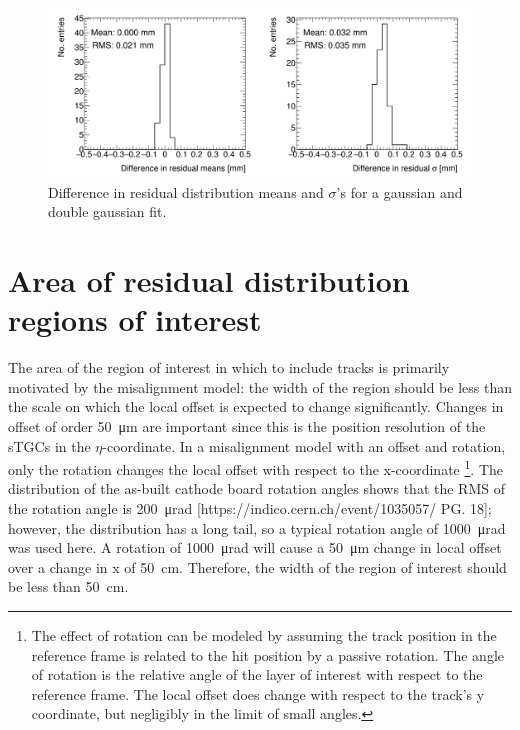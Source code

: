 \begin{figure}
    \centering
    \includegraphics[width = \textwidth]{figures/figure_compare_residual_fits_QL2C04_2900V_2021-02-08_2_fit_range_mean_pm_RMS_minus_quick_and_dirty_2900V_log_scale_layer1_fixedlayers34.png}
    \caption{Difference in residual distribution means and $\sigma$'s for a gaussian and double gaussian fit.}
    \label{fig:double_gaussian_compare_fits}
\end{figure}

\section{Area of residual distribution regions of interest}
\label{appendix:systematics_bin_size}


The area of the region of interest in which to include tracks is primarily motivated by the misalignment model: the width of the region should be less than the scale on which the local offset is expected to change significantly. Changes in offset of order \SI{50}{\micro\meter} are important since this is the position resolution of the sTGCs in the $\eta$-coordinate. In a misalignment model with an offset and rotation, only the rotation changes the local offset with respect to the x-coordinate \footnote{The effect of rotation can be modeled by assuming the track position in the reference frame is related to the hit position by a passive rotation. The angle of rotation is the relative angle of the layer of interest with respect to the reference frame. The local offset does change with respect to the track's y coordinate, but negligibly in the limit of small angles.}.  The distribution of the as-built cathode board rotation angles shows that the RMS of the rotation angle is \SI{200}{\micro\radian} [https://indico.cern.ch/event/1035057/ PG. 18]; however, the distribution has a long tail, so a typical rotation angle of \SI{1000}{\micro\radian} was used here. A rotation of \SI{1000}{\micro\radian} will cause a \SI{50}{\micro\meter} change in local offset over a change in x of \SI{50}{\centi\meter}. Therefore, the width of the region of interest should be less than \SI{50}{\centi\meter}.

